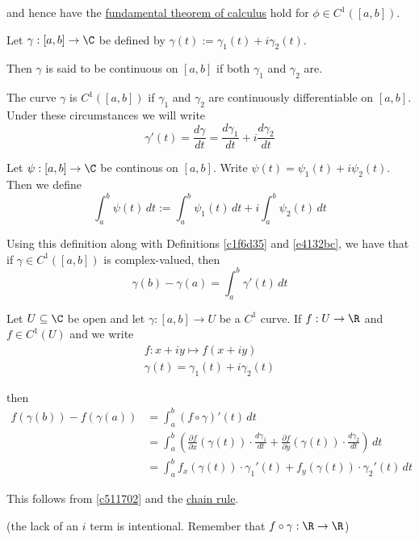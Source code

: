 and hence have the \href{b869dc0}{fundamental theorem of calculus} hold for
$\phi\in C^1([a,b])$.

\label{e4132bc}

Let $\gamma:[a,b]\to\C$ be defined by $\gamma(t):=\gamma_1(t) + i\gamma_2(t)$.

Then $\gamma$ is said to be continuous on $[a,b]$ if both $\gamma_1$ and
$\gamma_2$ are.

The curve $\gamma$ is $C^1([a,b])$ if $\gamma_1$ and $\gamma_2$ are
continuously differentiable on $[a,b]$. Under these circumstances we will write
$$
  \gamma'(t)=\frac{d\gamma}{dt}=\frac{d\gamma_1}{dt}+i\frac{d\gamma_2}{dt}
$$

\label{c511702}

Let $\psi:[a,b]\to\C$ be continous on $[a,b]$. Write
$\psi(t)=\psi_1(t)+i\psi_2(t)$. Then we define
$$
  \int_a^b\psi(t)\,dt:=\int_a^b\psi_1(t)\,dt+i\int_a^b\psi_2(t)\,dt
$$

Using this definition along with Definitions \autoref{c1f6d35} and
\autoref{e4132bc}, we have that if $\gamma\in C^1([a,b])$ is complex-valued,
then
$$
  \gamma(b)-\gamma(a)=\int_a^b\gamma'(t)\,dt
$$

\Proposition{}\label{f37b676}

Let $U\subseteq\C$ be open and let $\gamma:[a,b]\to U$ be a $C^1$ curve. If
$f:U\to\R$ and $f\in C^1(U)$ and we write
\begin{gather*}
  f:x+iy\mapsto f(x+iy) \\
  \gamma(t)=\gamma_1(t)+i\gamma_2(t)
\end{gather*}

then
\begin{align*}
  f(\gamma(b))-f(\gamma(a))
   &=\int_a^b (f\circ\gamma)'(t)\,dt \\
   &=\int_a^b\left(
  \frac{\partial f}{\partial x}(\gamma(t))\cdot\frac{d\gamma_1}{dt}+
  \frac{\partial f}{\partial y}(\gamma(t))\cdot\frac{d\gamma_2}{dt}
  \right)\,dt                        \\
   &=\int_a^b
  f_x(\gamma(t))\cdot\gamma_1'(t)+f_y(\gamma(t))\cdot\gamma_2'(t)
  \,dt
\end{align*}

This follows from \autoref{c511702} and the \href{d969d46}{chain rule}.

(the lack of an $i$ term is intentional. Remember that
$f\circ\gamma:\R\to\R$)

\label{b1e96fc}

